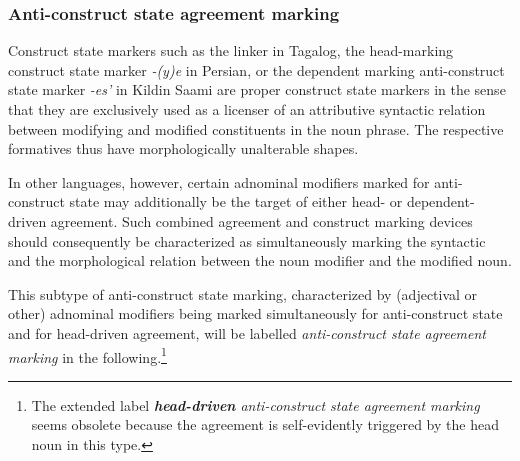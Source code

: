 \subsubsection{Anti\hyp{}construct state agreement marking} \label{anti-constr agr}
Construct state markers such as the linker in Tagalog, the head-marking construct state marker \textit{-(y)e} in Persian, or the dependent marking anti\hyp{}construct state marker \textit{-es'} in Kildin Saami are proper construct state markers in the sense that they are exclusively used as a licenser of an attributive syntactic relation between modifying and modified constituents in the noun phrase. The respective formatives thus have morphologically unalterable shapes.

In other languages, however, certain adnominal modifiers marked for anti\hyp{}construct state may additionally be the target of either head- or dependent-driven agreement. Such combined agreement and construct marking devices should consequently be characterized as simultaneously marking the syntactic and the morphological relation between the noun modifier and the modified noun. 

This subtype of anti\hyp{}construct state marking, characterized by (adjectival or other) adnominal modifiers being marked simultaneously for anti\hyp{}construct state and for head\hyp{}driven agreement, will be labelled \emph{anti\hyp{}construct state agreement marking} in the following.\footnote{The extended label \emph{\textbf{head\hyp{}driven} anti\hyp{}construct state agreement marking} seems obsolete because the agreement is self-evidently triggered by the head noun in this type.} %

